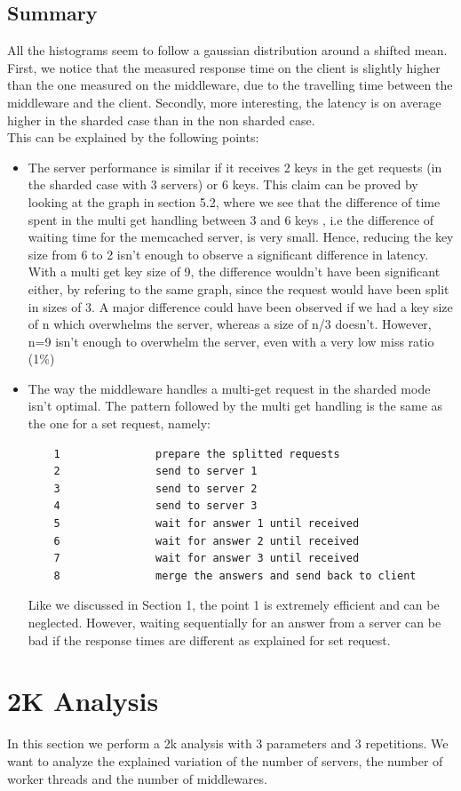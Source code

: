\documentclass[11pt,a4paper]{article}
\begin{document}
\subsection{Summary}

All the histograms seem to follow a gaussian distribution around a shifted mean. First, we notice that the measured response time on the client is slightly higher than the one measured on the middleware, due to the travelling time between the middleware and the client. Secondly, more interesting, the latency is on average higher in the sharded case than in the non sharded case. 
\\
This can be explained by the following points: 
\begin{itemize}
\item The server performance is similar if it receives 2 keys in the get requests (in the sharded case with 3 servers) or 6 keys. This claim can be proved by looking at the graph in section 5.2, where we see that the difference of time spent in the multi get handling between 3 and 6 keys , i.e the difference of waiting time for the memcached server, is very small. Hence, reducing the key size from 6 to 2 isn't enough to observe a significant difference in latency. 
With a multi get key size of 9, the difference wouldn't have been significant either, by refering to the same graph, since the request would have been split in sizes of 3. A major difference could have been observed if we had a key size of n which overwhelms the server, whereas a size of n/3 doesn't. However, n=9 isn't enough to overwhelm the server, even with a very low miss ratio (1\%)
\item The way the middleware handles a multi-get request in the sharded mode isn't optimal. The pattern followed by the multi get handling is the same as the one for a set request, namely: 
\begin{lstlisting}
	1				prepare the splitted requests
	2				send to server 1
	3				send to server 2
	4				send to server 3
	5				wait for answer 1 until received
	6				wait for answer 2 until received
	7				wait for answer 3 until received
	8				merge the answers and send back to client
\end{lstlisting}
Like we discussed in Section 1, the point 1 is extremely efficient and can be neglected. However, waiting sequentially for an answer from a server can be bad if the response times are different as explained for set request. 
\end{itemize}  

\newpage
\section{2K Analysis}
In this section we perform a 2k analysis with 3 parameters and 3 repetitions. We want to analyze the explained variation of the number of servers, the number of worker threads and the number of middlewares. 
\end{document}
